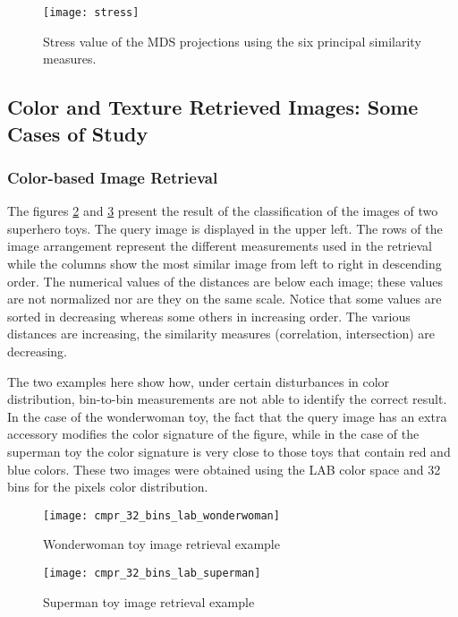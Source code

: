 \begin{figure}[!ht]
    \centering
    \texttt{[image: stress]}
 \caption{Stress value of the MDS projections using the six principal similarity measures.}
 \label{fig:stress}
\end{figure}

\subsection{Color and Texture Retrieved Images: Some Cases of Study}\label{ch:suplementary_material_retrieval_systems}

\subsubsection{Color-based Image Retrieval}\label{sec:sm_color:class}
The figures \ref{fig:wonderwoman_distances} and \ref{fig:superman_distances} present the result of the classification of the images of two superhero toys. The query image is displayed in the upper left. The rows of the image arrangement represent the different measurements used in the retrieval while the columns show the most similar image from left to right in descending order. The numerical values of the distances are below each image; these values are not normalized nor are they on the same scale. Notice that some values are sorted in decreasing whereas some others in increasing order. The various distances are increasing, the similarity measures (correlation, intersection) are decreasing.

The two examples here show how, under certain disturbances in color distribution, bin-to-bin measurements are not able to identify the correct result. In the case of the wonderwoman toy, the fact that the query image has an extra accessory modifies the color signature of the figure, while in the case of the superman toy the color signature is very close to those toys that contain red and blue colors. These two images were obtained using the LAB color space and 32 bins for the pixels color distribution.
\begin{figure}[!ht]
 \centering    
 \texttt{[image: cmpr\_32\_bins\_lab\_wonderwoman]}
 \caption{Wonderwoman toy image retrieval example}
 \label{fig:wonderwoman_distances}
\end{figure}

\begin{figure}[!ht]
 \centering    
 \texttt{[image: cmpr\_32\_bins\_lab\_superman]}
 \caption{Superman toy image retrieval example}
 \label{fig:superman_distances}
\end{figure}

